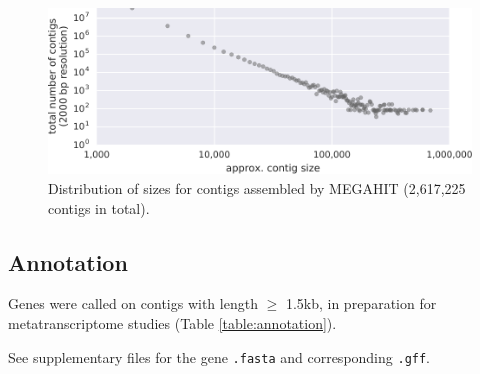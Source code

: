 \begin{figure}[H]
\centering
    \includegraphics[width=1.0\textwidth]{./tex/chapter2/figures/170123_frac_reads_binned_at_different_contig_lengths_and_total--INKSCAPED.pdf}
    \begin{singlespace}
    \caption[Distribution of contig sizes]{
        Distribution of sizes for contigs assembled by MEGAHIT (2,617,225 contigs in total).}
    \label{fig:contig_lengths}
    \end{singlespace}
\end{figure}



\subsection{Annotation}



Genes were called on contigs with length $\geq$ 1.5kb, in preparation for metatranscriptome studies (Table \ref{table:annotation}).

See supplementary files for the gene \texttt{.fasta} and corresponding \texttt{.gff}. %

